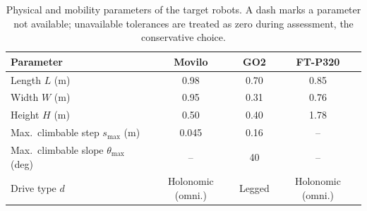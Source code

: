 \documentclass[a4paper, 10pt, conference]{ieeeconf}
\begin{document}
\begin{table}[t]
\caption{Physical and mobility parameters of the target robots. A dash marks a parameter not available; unavailable tolerances are treated as zero during assessment, the conservative choice.}
\label{tab:robots}
\centering
\footnotesize
\renewcommand{\arraystretch}{1.2}
\begin{tabular}{@{}p{2.4cm}ccc@{}}
\toprule
Parameter & Movilo & GO2 & FT-P320 \\
\midrule
Length $L$ (m) & 0.98 & 0.70 & 0.85 \\
Width $W$ (m) & 0.95 & 0.31 & 0.76 \\
Height $H$ (m) & 0.50 & 0.40 & 1.78 \\
Max.\ climbable step $s_{\max}$ (m) & 0.045 & 0.16 & -- \\
Max.\ climbable slope $\theta_{\max}$ (deg) & -- & 40 & -- \\
Drive type $d$ & Holonomic (omni.) & Legged & Holonomic (omni.) \\
\bottomrule
\end{tabular}
\end{table}
 
\end{document}
